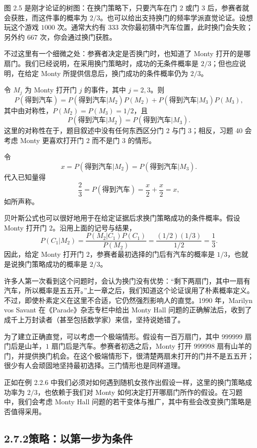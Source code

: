 \documentclass[UTF8, 12pt, fontset=fandol, oneside]{ctexart}
\begin{document}
图 2.5 是刚才论证的树图：在换门策略下，只要汽车在门 $2$ 或门 $3$ 后，参赛者就会获胜，而这件事的概率为 $2/3$。也可以给出支持换门的频率学派直觉论证。设想玩这个游戏 $1000$ 次。通常大约有 $333$ 次你最初猜中汽车位置，此时换门会失败；另外约 $667$ 次，你会通过换门获胜。

不过这里有一个细微之处：参赛者决定是否换门时，也知道了 Monty 打开的是哪扇门。我们已经说明，在采用换门策略时，成功的无条件概率是 $2/3$；但也应说明，在给定 Monty 所提供信息后，换门成功的条件概率仍为 $2/3$。

令 $M_j$ 为 Monty 打开门 $j$ 的事件，其中 $j=2,3$。则
\[
  P(\text{得到汽车})
  =
  P(\text{得到汽车}|M_2)P(M_2)
  +
  P(\text{得到汽车}|M_3)P(M_3),
\]
其中由对称性，$P(M_2)=P(M_3)=1/2$，且
\[
  P(\text{得到汽车}|M_2)=P(\text{得到汽车}|M_3).
\]
这里的对称性在于，题目叙述中没有任何东西区分门 $2$ 与门 $3$；相反，习题 40 会考虑 Monty 更喜欢打开门 $2$ 而不是门 $3$ 的情形。

令
\[
  x=P(\text{得到汽车}|M_2)=P(\text{得到汽车}|M_3).
\]
代入已知量得
\[
  \frac23=P(\text{得到汽车})=\frac{x}{2}+\frac{x}{2}=x,
\]
如所声称。

贝叶斯公式也可以很好地用于在给定证据后求换门策略成功的条件概率。假设 Monty 打开门 $2$。沿用上面的记号与结果，
\[
  P(C_1|M_2)=
  \frac{P(M_2|C_1)P(C_1)}{P(M_2)}
  =
  \frac{(1/2)(1/3)}{1/2}
  =
  \frac13.
\]
因此，给定 Monty 打开门 $2$，参赛者最初选择的门后有汽车的概率是 $1/3$，也就是说换门策略成功的概率是 $2/3$。

许多人第一次看到这个问题时，会认为换门没有优势：“剩下两扇门，其中一扇有汽车，所以概率是五五开。”上一章之后，我们知道这个论证误用了朴素概率定义。不过，即使朴素定义在这里不合适，它仍然强烈影响人的直觉。1990 年，Marilyn vos Savant 在《Parade》杂志专栏中给出 Monty Hall 问题的正确解法后，收到了成千上万封读者（甚至包括数学家）来信，坚持说她错了。

为了建立正确直觉，可以考虑一个极端情形。假设有一百万扇门，其中 $999999$ 扇门后是山羊，$1$ 扇门后是汽车。参赛者初选之后，Monty 打开 $999998$ 扇有山羊的门，并提供换门机会。在这个极端情形下，很清楚两扇未打开的门并不是五五开；很少有人会顽固地坚持最初选择。三门情形也是同样道理。

正如在例 2.2.6 中我们必须对如何遇到随机女孩作出假设一样，这里的换门策略成功率为 $2/3$，也依赖于我们对 Monty 如何决定打开哪扇门所作的假设。在习题中，我们会考虑 Monty Hall 问题的若干变体与推广，其中有些会改变换门策略是否值得采用。

\subsection*{2.7.2\quad 策略：以第一步为条件}
\end{document}
